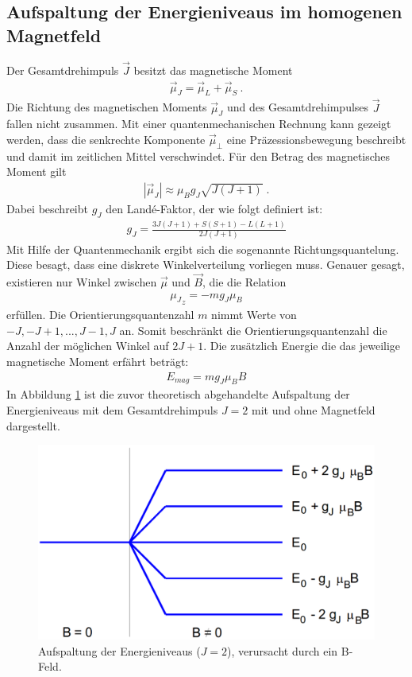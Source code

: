 \subsection{Aufspaltung der Energieniveaus im homogenen Magnetfeld}
Der Gesamtdrehimpuls $\vec{J}$ besitzt das magnetische Moment
\begin{align}
	\vec{\mu}_J=\vec{\mu}_L+\vec{\mu}_S \:.
\end{align}
Die Richtung des magnetischen Moments $\vec{\mu}_J$ und des Gesamtdrehimpulses  $\vec{J}$ fallen nicht zusammen. Mit einer quantenmechanischen Rechnung kann gezeigt werden, dass die senkrechte Komponente $\vec{\mu}_\perp$ eine Präzessionsbewegung beschreibt und damit im zeitlichen Mittel verschwindet. Für den Betrag des magnetisches Moment gilt
\begin{align}
	|\vec{\mu}_J| \approx \mu_B g_J\sqrt{J(J+1)}\;.
\end{align}
Dabei beschreibt $g_J$ den Land\'{e}-Faktor, der wie folgt definiert ist:
\begin{align}
	g_J=\frac{3J(J+1)+S(S+1)-L(L+1)}{2J(J+1)}
\end{align}
Mit Hilfe der Quantenmechanik ergibt sich die sogenannte Richtungsquantelung. Diese besagt, dass eine diskrete Winkelverteilung vorliegen muss. Genauer gesagt, existieren nur Winkel zwischen $\vec{\mu}$ und $\vec{B}$, die die Relation
\begin{align}
	{\mu_J}_z=-mg_J\mu_B
\end{align}
erfüllen. Die Orientierungsquantenzahl $m$ nimmt Werte von $-J,-J+1,...,J-1,J$ an. Somit beschränkt die Orientierungsquantenzahl die Anzahl der möglichen Winkel auf $2J+1$. Die zusätzlich Energie die das jeweilige magnetische Moment erfährt beträgt:
\begin{align}
	E_{mag}=mg_J\mu_B B
\end{align}
In Abbildung \ref{fig:theorie_1} ist die zuvor theoretisch abgehandelte Aufspaltung der Energieniveaus mit dem Gesamtdrehimpuls $J=2$ mit und ohne Magnetfeld dargestellt.

\begin{figure}[H]
  \centering
  \includegraphics[width=.5\textwidth]{ressources/Aufspaltung.png}
  \caption{Aufspaltung der Energieniveaus ($J=2$), verursacht durch ein B-Feld\cite{skript}.}
  \label{fig:theorie_1}
\end{figure}

